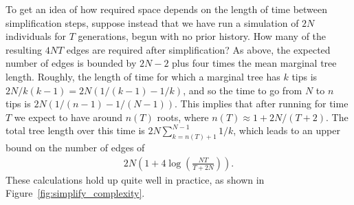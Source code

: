 \documentclass{article}
\begin{document}
To get an idea of how required space depends on the length of time between simplification steps,
suppose instead that we have run a simulation of $2N$ individuals for $T$ generations,
begun with no prior history.
How many of the resulting $4NT$ edges are required after simplification?
As above, the expected number of edges is bounded by $2N-2$ plus four times the mean marginal tree length.
Roughly, the length of time for which a marginal tree has $k$ tips is
$2N/k(k-1) = 2N(1/(k-1) - 1/k)$,
and so the time to go from $N$ to $n$ tips is $2N(1/(n-1) - 1/(N-1))$.
This implies that after running for time $T$ we expect to
have around $n(T)$ roots, where $n(T) \approx 1 + 2N/(T+2)$.
The total tree length over this time is
$2 N \sum_{k=n(T)+1}^{N-1} 1/k$, which
leads to an upper bound on the number of edges of
\begin{align}
    \label{eqn:edge_bound}
    2 N \left( 1 + 4 \log\left( \frac{NT}{T + 2 N} \right)\right) .
\end{align}
These calculations hold up quite well in practice,
as shown in Figure~\ref{fig:simplify_complexity}.
\end{document}
